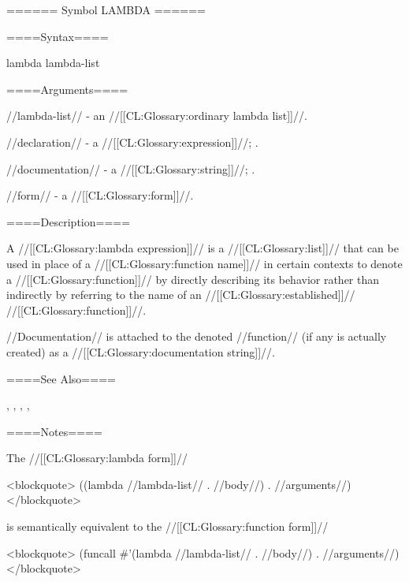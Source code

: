 ====== Symbol LAMBDA ======

====Syntax====

\Defspec lambda {lambda-list {\DeclsAndDoc} }

====Arguments====

//lambda-list// - an //[[CL:Glossary:ordinary lambda list]]//.

//declaration// - a  //[[CL:Glossary:expression]]//; \noeval.

//documentation// - a //[[CL:Glossary:string]]//; \noeval.

//form// - a //[[CL:Glossary:form]]//.

====Description====

A //[[CL:Glossary:lambda expression]]// is a //[[CL:Glossary:list]]// that can be used in place of a //[[CL:Glossary:function name]]// in certain contexts to denote a //[[CL:Glossary:function]]// by directly describing its behavior rather than indirectly by referring to the name of an //[[CL:Glossary:established]]// //[[CL:Glossary:function]]//.

//Documentation// is attached to the denoted //function// (if any is actually created) as a //[[CL:Glossary:documentation string]]//.

====See Also====

, , {\secref\LambdaExpressions}, {\secref\LambdaForms}, {\secref\DocVsDecls}

====Notes====

The //[[CL:Glossary:lambda form]]//

<blockquote> ((lambda //lambda-list// . //body//) . //arguments//) </blockquote>

is semantically equivalent to the //[[CL:Glossary:function form]]//

<blockquote> (funcall #'(lambda //lambda-list// . //body//) . //arguments//) </blockquote>

 
